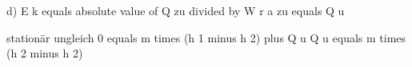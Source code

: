 d) E k equals absolute value of Q zu divided by W r  
a zu equals Q u  

stationär ungleich  
0 equals m times (h 1 minus h 2) plus Q u  
Q u equals m times (h 2 minus h 2)